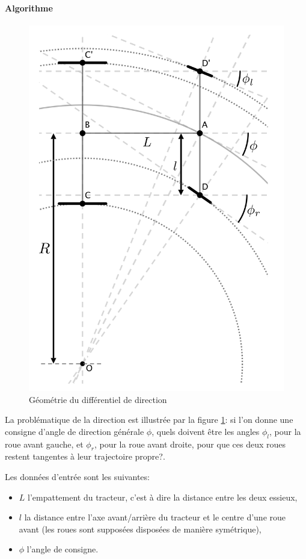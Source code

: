 \documentclass[12pt,a4paper]{report}
\begin{document}
			\paragraph{Algorithme}
			\label{algo-steering}
			
			\begin{figure}[!]
				\centering
				\includegraphics[width=0.7\linewidth]{img/ackermann}
				\caption[Géométrie Différentiel]{Géométrie du différentiel de direction}
				\label{fig:ackermann}
			\end{figure}
		
			\para La problématique de la direction est illustrée par la figure \ref{fig:ackermann}: si l'on donne une consigne d'angle de direction générale $\phi$, quels doivent être les angles $\phi_l$, pour la roue avant gauche, et $\phi_r$, pour la roue avant droite, pour que ces deux roues restent tangentes à leur trajectoire propre?.
			
			\para Les données d'entrée sont les suivantes:
			\begin{itemize}
				\item $L$ l'empattement du tracteur, c'est à dire la distance entre les deux essieux,
				\item $l$ la distance entre l'axe avant/arrière du tracteur et le centre d'une roue avant (les roues sont supposées disposées de manière symétrique),
				\item $\phi$ l'angle de consigne.
			\end{itemize}
		
\end{document}
